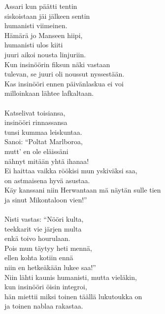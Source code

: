 
            Assari kun päätti tentin \\
            siskoistaan jäi jälkeen sentin \\
            humanisti viimeinen. \\
            Hämärä jo Manseen hiipi, \\
            humanisti ulos kiiti \\
            juuri aikoi nousta linjuriin. \\
            Kun insinöörin fiksun näki vastaan \\
            tulevan, se juuri oli noussut nyssestään. \\
            Kas insinööri ennen päivänlaskua ei voi \\
            milloinkaan lähtee lafkaltaan. \\
\hspace{10mm} \\
            Katselivat toisiansa, \\
            insinööri rinnassansa \\
            tunsi kummaa leiskuntaa. \\
            Sanoi: “Poltat Marlboroa, \\
            mutt’ en ole eläissäni \\
            nähnyt mitään yhtä ihanaa! \\
            Ei haittaa vaikka röökisi mun yskiväksi saa, \\
            on astmaisena hyvä asustaa. \\
            Käy kanssani niin Herwantaan mä näytän sulle tien \\
            ja sinut Mikontaloon vien!” \\
\hspace{10mm} \\
            Nisti vastas: “Nööri kulta, \\
            teekkarit vie järjen multa \\
            enkä toivo hourulaan. \\
            Pois mun täytyy heti mennä, \\
            ellen kohta kotiin ennä \\
            niin en hetkeäkään lukee saa!” \\
            Niin lähti kaunis humanisti, mutta vieläkin, \\
            kun insinööri öisin integroi, \\
            hän miettii miksi toinen täällä lukutoukka on \\
            ja toinen nablaa rakastaa. \\
